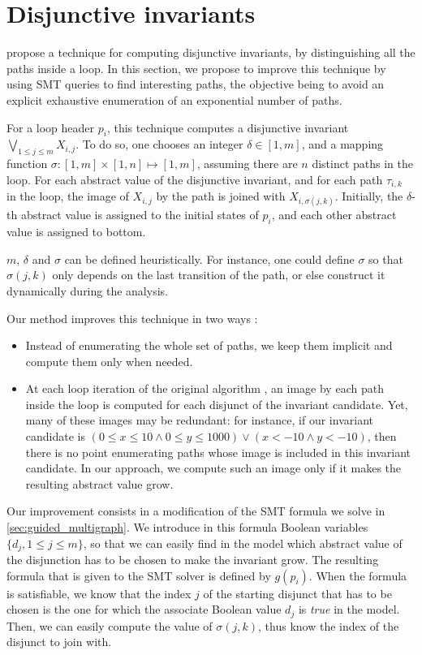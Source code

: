 \documentclass[preprint]{sigplanconf}
\begin{document}
\section{Disjunctive invariants}
\label{sec:disjunctive}

\citet{DBLP:conf/pldi/GulwaniZ10} propose a technique for computing disjunctive invariants, by
distinguishing all the paths inside a loop. In
this section, we propose to improve this technique by using SMT queries to find
interesting paths, the objective being to avoid an explicit exhaustive
enumeration of an exponential number of paths.

For a loop header $p_i$, this technique computes a disjunctive invariant
$\bigvee_{1\leq j \leq m} X_{i,j}$. 
To do so, one chooses an integer $\delta \in [1,m]$, and
a mapping function $\sigma: [1,m] \times [1,n] \mapsto [1,m]$, assuming there
are $n$ distinct paths in the loop.  For each
abstract value of the disjunctive invariant, and for each path $\tau_{i,k}$ in the loop, the
image of $X_{i,j}$ by the path is joined with
$X_{i,\sigma(j,k)}$.
Initially, the $\delta$-th abstract value is assigned to the initial states of
$p_i$, and each other abstract value is assigned to bottom.

$m$, $\delta$ and $\sigma$ can be defined heuristically.
For instance, one could define $\sigma$ so that $\sigma(j,k)$ only depends on the
last transition of the path, or else construct it dynamically during the
analysis.

Our method improves this technique in two ways :
\begin{itemize}
\item Instead of enumerating the whole set of paths, we keep them implicit and
compute them only when needed.

\item At each loop iteration of the original algorithm \citep{DBLP:conf/pldi/GulwaniZ10}, an image by each path inside the loop is computed for each disjunct of the invariant candidate.
Yet, many of these images may be redundant: for instance, if our invariant candidate is $(0 \leq x \leq 10 \land 0 \leq y \leq 1000) \lor (x < -10 \land y < -10)$, then there is no point enumerating paths whose image is included in this invariant candidate.
In our approach, we compute such an image only if it makes the resulting abstract value grow.
\end{itemize}

Our improvement consists in a modification of the SMT formula we solve in
\ref{sec:guided_multigraph}.
We introduce in this formula Boolean variables $\{d_j, 1 \leq j \leq m\}$, so
that we can easily find in the model which abstract value of the disjunction has
to be chosen to make the invariant grow.
The resulting formula that is given to the SMT solver is defined
by $g(p_i)$.
When the formula is satisfiable, we know that the index $j$ of the starting
disjunct that has to be chosen is the one for which the associate Boolean value
$d_j$ is \emph{true} in the model. Then, we can easily compute the value of 
$\sigma(j,k)$, thus know the index of the disjunct to join with.
\end{document}
